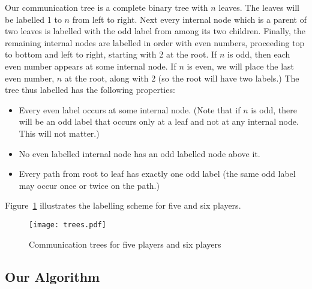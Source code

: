 \documentclass[12pt]{article}
\theoremstyle{definition}
\begin{document}
Our communication tree is a complete binary tree with $n$ leaves. 
The leaves will be labelled 1 to $n$ from left to right. Next every 
internal node which is a parent of two leaves is labelled with the 
odd label from among its two children. Finally, the remaining internal 
nodes are labelled in order with even numbers, proceeding top to bottom and left to right, starting with 2 at the root. If $n$ is odd, then each even number
appears at some internal node. If $n$ is even, we will place the last 
even number, $n$ at the root, along with 2 (so the root will have two labels.)
The tree thus labelled has the following properties:
\begin{itemize}
\item Every even label occurs at some internal node. (Note that if $n$ is 
odd, there will be an odd label that occurs only at a leaf and not at any 
internal node. This will not matter.)
\item No even labelled internal node has an odd labelled node above it.
\item Every path from root to leaf has exactly one odd label (the same odd 
label may occur once or twice on the path.)
\end{itemize}
Figure~\ref{fig:tree} illustrates the labelling scheme for five and six players.

\begin{figure}
\begin{center}
\texttt{[image: trees.pdf]}
\end{center}
\caption{Communication trees for five players and six players}
\label{fig:tree}
\end{figure}




\subsection{Our Algorithm}\label{sec:alg}
\end{document}
